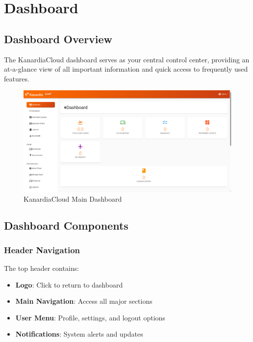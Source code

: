 \chapter{Dashboard}

\section{Dashboard Overview}

The KanardiaCloud dashboard serves as your central control center, providing an at-a-glance view of all important information and quick access to frequently used features.

\begin{figure}[H]
\centering
\includegraphics[width=\textwidth]{images/main_dashboard.png}
\caption{KanardiaCloud Main Dashboard}
\label{fig:main_dashboard}
\end{figure}

\section{Dashboard Components}

\subsection{Header Navigation}

The top header contains:

\begin{itemize}
    \item \textbf{Logo}: Click to return to dashboard
    \item \textbf{Main Navigation}: Access all major sections
    \item \textbf{User Menu}: Profile, settings, and logout options
    \item \textbf{Notifications}: System alerts and updates
\end{itemize}

